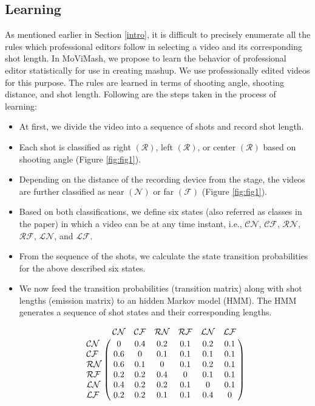 \documentclass{sig-alternate}
\begin{document}
\subsection{Learning}\label{learn}
As mentioned earlier in Section \ref{intro}, it is difficult to precisely enumerate all the rules which professional editors follow in selecting a video and its corresponding shot length. In MoViMash, we propose to learn the behavior of professional editor statistically for use in creating mashup. We use professionally edited videos for this purpose. The rules are learned in terms of shooting angle, shooting distance, and shot length. Following are the steps taken in the process of learning:
\begin{itemize}
    \item At first, we divide the video into a sequence of shots and record shot length.
    \item Each shot is classified as right $\mathcal{(R)}$, left $\mathcal{(R)}$, or center $\mathcal{(R)}$ based on shooting angle (Figure \ref{fig:fig1}).
    \item Depending on the distance of the recording device from the stage, the videos are further classified as near $\mathcal{(N)}$ or far $\mathcal{(F)}$ (Figure \ref{fig:fig1}).
    \item Based on both classifications, we define six states (also referred as classes in the paper) in which a video can be at any time instant, i.e., $\mathcal{CN}$, $\mathcal{CF}$, $\mathcal{RN}$, $\mathcal{RF}$, $\mathcal{LN}$, and $\mathcal{LF}$.
    \item From the sequence of the shots, we calculate the state transition probabilities for the above described six states.
    \item We now feed the transition probabilities (transition matrix) along with shot lengths (emission matrix) to an hidden Markov model (HMM). The HMM generates a sequence of shot states and their corresponding lengths.
    
    \begin{equation}
        \bordermatrix{~ & \mathcal{CN} & \mathcal{CF} & \mathcal{RN} & \mathcal{RF} & \mathcal{LN} & \mathcal{LF} \cr
         \mathcal{CN}  &  0 & 0.4 & 0.2 & 0.1 & 0.2 & 0.1 \cr
         \mathcal{CF} & 0.6 & 0 & 0.1 & 0.1 & 0.1 & 0.1\cr
         \mathcal{RN} & 0.6 & 0.1 & 0 & 0.1 & 0.2 & 0.1\cr
         \mathcal{RF} & 0.2 & 0.2 & 0.4 & 0 & 0.1 & 0.1\cr
         \mathcal{LN} & 0.4 & 0.2 & 0.2 & 0.1 & 0 & 0.1\cr
         \mathcal{LF} & 0.2 & 0.2 & 0.1 & 0.1 & 0.4 & 0\cr
        }
    \end{equation}
\end{itemize}
\end{document}
